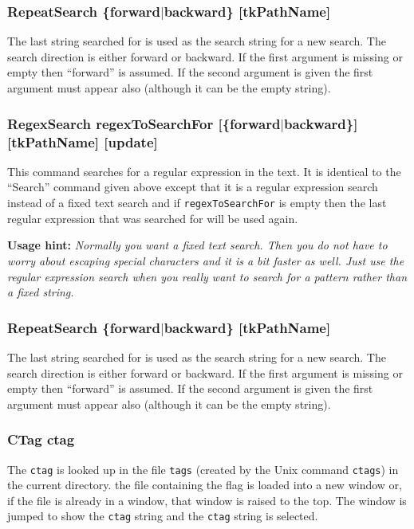 \subsubsection{RepeatSearch \{forward$\mid$backward\} [tkPathName]}
The last string searched for is used as the search string
for a new search.
The search direction is either forward or backward.
If the first argument is missing or empty then ``forward''
is assumed.
If the second argument is given the first argument must appear also
(although it can be the empty string).

\subsubsection{RegexSearch regexToSearchFor
		[\{forward$\mid$backward\}] [tkPathName] [update]}
This command searches for a regular expression in the text.
It is identical to the ``Search'' command given above except that
it is a regular expression search instead of a fixed text search and
if {\tt regexToSearchFor} is empty then the last regular expression
that was searched for will be used again.

{\bf Usage hint:} {\it Normally you want a fixed text search.
Then you do not have to worry about escaping special characters
and it is a bit faster as well.
Just use the regular expression search when you really want to
search for a pattern rather than a fixed string.}

\subsubsection{RepeatSearch \{forward$\mid$backward\} [tkPathName]}
The last string searched for is used as the search string
for a new search.
The search direction is either forward or backward.
If the first argument is missing or empty then ``forward''
is assumed.
If the second argument is given the first argument must appear also
(although it can be the empty string).

\subsubsection{CTag ctag}
The {\tt ctag} is looked up in the file {\tt tags}
(created by the Unix command {\tt ctags}) in the current directory.
the file containing the flag is loaded into a new window
or, if the file is already in a window, that window is raised
to the top.
The window is jumped to show the {\tt ctag} string and the {\tt ctag} string
is selected.

